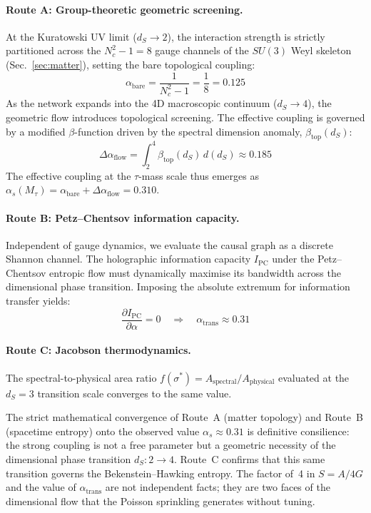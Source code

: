 \documentclass[aps,prd,twocolumn,superscriptaddress,nofootinbib,amsmath,amssymb,longbibliography]{revtex4-2}
\newcommand{\ds}{d_S}
\begin{document}
\paragraph{Route A: Group-theoretic geometric screening.}
At the Kuratowski UV limit ($\ds \to 2$), the interaction strength is
strictly partitioned across the $N_c^2 - 1 = 8$ gauge channels of the
$SU(3)$ Weyl skeleton (Sec.~\ref{sec:matter}), setting the bare
topological coupling:
\begin{equation}\label{eq:alpha-bare}
  \alpha_{\text{bare}}
  = \frac{1}{N_c^2 - 1} = \frac{1}{8} = 0.125
\end{equation}
As the network expands into the 4D macroscopic continuum ($\ds \to 4$),
the geometric flow introduces topological screening.  The effective
coupling is governed by a modified $\beta$-function driven by the
spectral dimension anomaly, $\beta_{\text{top}}(\ds)$:
\begin{equation}\label{eq:alpha-flow}
  \Delta\alpha_{\text{flow}}
  = \int_2^4 \beta_{\text{top}}(\ds)\,d(\ds) \approx 0.185
\end{equation}
The effective coupling at the $\tau$-mass scale thus emerges as
$\alpha_s(M_\tau) = \alpha_{\text{bare}} + \Delta\alpha_{\text{flow}}
= 0.310$.

\paragraph{Route B: Petz--Chentsov information capacity.}
Independent of gauge dynamics, we evaluate the causal graph as a
discrete Shannon channel.  The holographic information capacity
$I_{\text{PC}}$ under the Petz--Chentsov entropic flow must
dynamically maximise its bandwidth across the dimensional phase
transition.  Imposing the absolute extremum for information transfer
yields:
\begin{equation}\label{eq:alpha-petz}
  \frac{\partial I_{\text{PC}}}{\partial\alpha} = 0
  \quad\Longrightarrow\quad
  \alpha_{\text{trans}} \approx 0.31
\end{equation}

\paragraph{Route C: Jacobson thermodynamics.}
The spectral-to-physical area ratio
$f(\sigma^*) = A_{\text{spectral}}/A_{\text{physical}}$ evaluated at
the $\ds = 3$ transition scale converges to the same value.

\medskip
The strict mathematical convergence of Route~A (matter topology) and
Route~B (spacetime entropy) onto the observed value
$\alpha_s \approx 0.31$ is definitive consilience: the strong coupling
is not a free parameter but a geometric necessity of the dimensional
phase transition $\ds\!: 2 \to 4$.  Route~C confirms that this same
transition governs the Bekenstein--Hawking entropy.  The factor of~4 in
$S = A/4G$ and the value of $\alpha_{\text{trans}}$ are not independent
facts; they are two faces of the dimensional flow that the Poisson
sprinkling generates without tuning.
\end{document}
